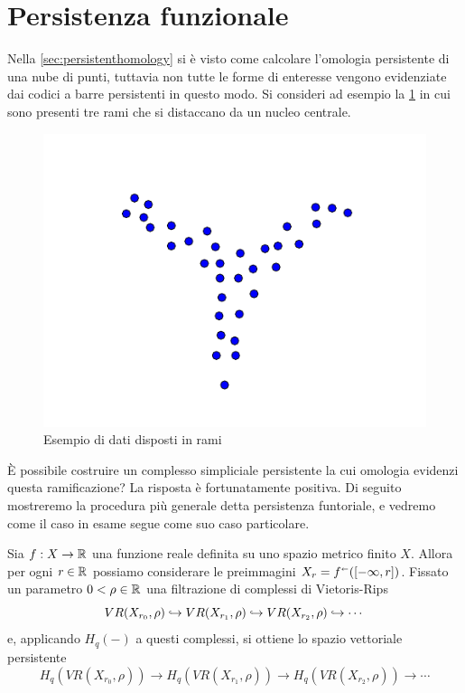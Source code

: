 \section{Persistenza funzionale}\label{sec:functionalpersistence}

Nella \cref{sec:persistenthomology} si è visto come calcolare l'omologia persistente di una nube di punti, tuttavia non tutte le forme di enteresse vengono evidenziate dai codici a barre persistenti in questo modo. Si consideri ad esempio la \cref{fig:threeflares} in cui sono presenti tre rami che si distaccano da un nucleo centrale.

\begin{figure}[ht]
  \includegraphics[width=.7\linewidth]{gfx/functional_all.pdf}
  \caption{Esempio di dati disposti in rami}
  \label{fig:threeflares}
\end{figure}

\`E possibile costruire un complesso simpliciale persistente la cui omologia evidenzi questa ramificazione? La risposta è fortunatamente positiva. Di seguito mostreremo la procedura più generale detta persistenza funtoriale, e vedremo come il caso in esame segue come suo caso particolare.

Sia $f:X\to \mathbb{R}$ una funzione reale definita su uno spazio metrico finito $X$. Allora per ogni $r\in \mathbb{R}$ possiamo considerare le preimmagini $X_r=f^{\shortleftarrow}([-\infty,r])$. Fissato un parametro $0<\rho\in \mathbb{R}$ una filtrazione di complessi di Vietoris-Rips
\begin{equation*}
  VR(X_{r_0},\rho)\hookrightarrow VR(X_{r_1},\rho)\hookrightarrow VR(X_{r_2},\rho)\hookrightarrow \cdots
\end{equation*}
e, applicando $H_q(-)$ a questi complessi, si ottiene lo spazio vettoriale persistente
\begin{equation*}
  H_q(VR(X_{r_0},\rho))\to H_q(VR(X_{r_1},\rho))\to H_q(VR(X_{r_2},\rho))\to \cdots
\end{equation*}

